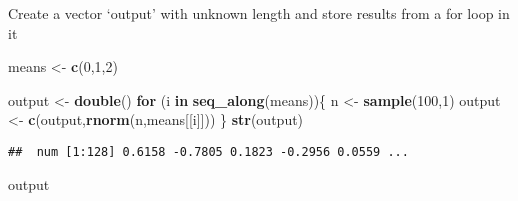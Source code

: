 \documentclass[
]{article}
\newenvironment{Shaded}{\begin{snugshade}}{\end{snugshade}}
\newcommand{\ControlFlowTok}[1]{\textcolor[rgb]{0.13,0.29,0.53}{\textbf{#1}}}
\newcommand{\DecValTok}[1]{\textcolor[rgb]{0.00,0.00,0.81}{#1}}
\newcommand{\FunctionTok}[1]{\textcolor[rgb]{0.13,0.29,0.53}{\textbf{#1}}}
\newcommand{\NormalTok}[1]{#1}
\newcommand{\OtherTok}[1]{\textcolor[rgb]{0.56,0.35,0.01}{#1}}
\begin{document}
Create a vector `output' with unknown length and store results from a
for loop in it

\begin{Shaded}
\begin{Highlighting}[]
\NormalTok{means }\OtherTok{\textless{}{-}} \FunctionTok{c}\NormalTok{(}\DecValTok{0}\NormalTok{,}\DecValTok{1}\NormalTok{,}\DecValTok{2}\NormalTok{)}

\NormalTok{output }\OtherTok{\textless{}{-}} \FunctionTok{double}\NormalTok{()}
\ControlFlowTok{for}\NormalTok{ (i }\ControlFlowTok{in} \FunctionTok{seq\_along}\NormalTok{(means))\{}
\NormalTok{  n }\OtherTok{\textless{}{-}} \FunctionTok{sample}\NormalTok{(}\DecValTok{100}\NormalTok{,}\DecValTok{1}\NormalTok{)}
\NormalTok{  output }\OtherTok{\textless{}{-}} \FunctionTok{c}\NormalTok{(output,}\FunctionTok{rnorm}\NormalTok{(n,means[[i]]))}
\NormalTok{\}}
\FunctionTok{str}\NormalTok{(output)}
\end{Highlighting}
\end{Shaded}

\begin{verbatim}
##  num [1:128] 0.6158 -0.7805 0.1823 -0.2956 0.0559 ...
\end{verbatim}

\begin{Shaded}
\begin{Highlighting}[]
\NormalTok{output}
\end{Highlighting}
\end{Shaded}
\end{document}
